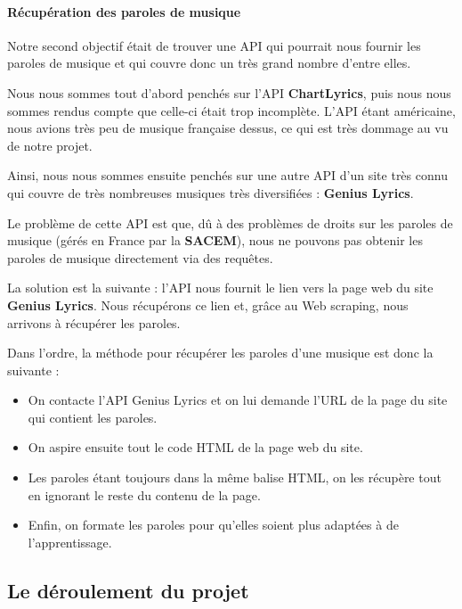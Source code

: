 \documentclass[12pt,french]{article}
\begin{document}
\paragraph{Récupération des paroles de musique \\}

Notre second objectif était de trouver une API qui pourrait nous fournir les paroles de musique et qui couvre donc un très grand nombre d'entre elles.

\medskip

Nous nous sommes tout d'abord penchés sur l'API \textbf{ChartLyrics}, puis nous nous sommes rendus compte que celle-ci était trop incomplète. L'API étant américaine, nous avions très peu de musique française dessus, ce qui est très dommage au vu de notre projet.

\medskip

Ainsi, nous nous sommes ensuite penchés sur une autre API d'un site très connu qui couvre de très nombreuses musiques très diversifiées : \textbf{Genius Lyrics}.

Le problème de cette API est que, dû à des problèmes de droits sur les paroles de musique (gérés en France par la \textbf{SACEM}), nous ne pouvons pas obtenir les paroles de musique directement via des requêtes.

La solution est la suivante : l'API nous fournit le lien vers la page web du site \textbf{Genius Lyrics}. Nous récupérons ce lien et, grâce au Web scraping, nous arrivons à récupérer les paroles.

Dans l'ordre, la méthode pour récupérer les paroles d'une musique est donc la suivante :

\medskip

\begin{itemize}
	\item On contacte l'API Genius Lyrics et on lui demande l'URL de la page du site qui contient les paroles.
	\item On aspire ensuite tout le code HTML de la page web du site.
	\item Les paroles étant toujours dans la même balise HTML, on les récupère tout en ignorant le reste du contenu de la page.
	\item Enfin, on formate les paroles pour qu'elles soient plus adaptées à de l'apprentissage.
\end{itemize}

\medskip

\subsection{Le déroulement du projet}
\end{document}
